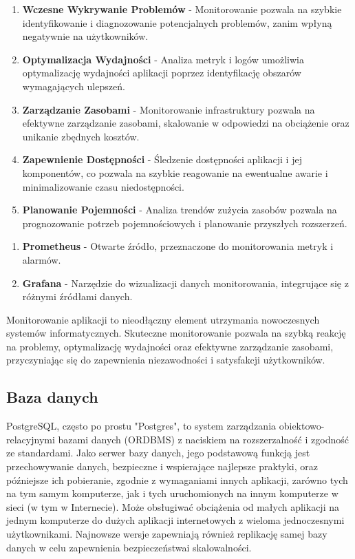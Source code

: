 \begin{enumerate}
\item {\bf Wczesne Wykrywanie Problemów}
   - Monitorowanie pozwala na szybkie identyfikowanie i diagnozowanie potencjalnych problemów, zanim wpłyną negatywnie na użytkowników.
   
\item {\bf Optymalizacja Wydajności}
   - Analiza metryk i logów umożliwia optymalizację wydajności aplikacji poprzez identyfikację obszarów wymagających ulepszeń.

\item {\bf Zarządzanie Zasobami}
   - Monitorowanie infrastruktury pozwala na efektywne zarządzanie zasobami, skalowanie w odpowiedzi na obciążenie oraz unikanie zbędnych kosztów.

\item {\bf Zapewnienie Dostępności}
   - Śledzenie dostępności aplikacji i jej komponentów, co pozwala na szybkie reagowanie na ewentualne awarie i minimalizowanie czasu niedostępności.

\item {\bf Planowanie Pojemności}
   - Analiza trendów zużycia zasobów pozwala na prognozowanie potrzeb pojemnościowych i planowanie przyszłych rozszerzeń.
\end{enumerate}


\begin{enumerate}
\item {\bf Prometheus}
   - Otwarte źródło, przeznaczone do monitorowania metryk i alarmów.

\item {\bf Grafana}
   - Narzędzie do wizualizacji danych monitorowania, integrujące się z różnymi źródłami danych.
\end{enumerate}


\noindent Monitorowanie aplikacji to nieodłączny element utrzymania nowoczesnych systemów informatycznych. Skuteczne monitorowanie pozwala na szybką reakcję na problemy, optymalizację wydajności oraz efektywne zarządzanie zasobami, przyczyniając się do zapewnienia niezawodności i satysfakcji użytkowników.

\subsection{Baza danych}
PostgreSQL, często po prostu "Postgres", to system zarządzania obiektowo-relacyjnymi bazami danych (ORDBMS) z naciskiem na rozszerzalność i zgodność ze standardami. Jako serwer bazy danych, jego podstawową funkcją jest przechowywanie danych, bezpieczne i wspierające najlepsze praktyki, oraz późniejsze ich pobieranie, zgodnie z wymaganiami innych aplikacji, zarówno tych na tym samym komputerze, jak i tych uruchomionych na innym komputerze w sieci (w tym w Internecie). Może obsługiwać obciążenia od małych aplikacji na jednym komputerze do dużych aplikacji internetowych z wieloma jednoczesnymi użytkownikami. Najnowsze wersje zapewniają również replikację samej bazy danych w celu zapewnienia bezpieczeństwa\linebreak i skalowalności.

